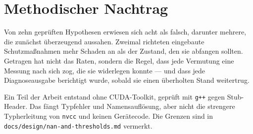 \documentclass[11pt,a4paper]{article}
\newcommand{\code}[1]{\texttt{\small #1}}
\begin{document}
\section*{Methodischer Nachtrag}

Von zehn geprüften Hypothesen erwiesen sich acht als falsch, darunter mehrere,
die zunächst überzeugend aussahen. Zweimal richteten eingebaute
Schutzmaßnahmen mehr Schaden an als der Zustand, den sie abfangen sollten.
Getragen hat nicht das Raten, sondern die Regel, dass jede Vermutung eine
Messung nach sich zog, die sie widerlegen konnte --- und dass jede
Diagnoseausgabe berichtigt wurde, sobald sie einen überholten Stand
weitertrug.

Ein Teil der Arbeit entstand ohne CUDA-Toolkit, geprüft mit \code{g++} gegen
Stub-Header. Das fängt Typfehler und Namensauflösung, aber nicht die strengere
Typherleitung von \code{nvcc} und keinen Gerätecode. Die Grenzen sind in
\code{docs/design/nan-and-thresholds.md} vermerkt.
\end{document}
